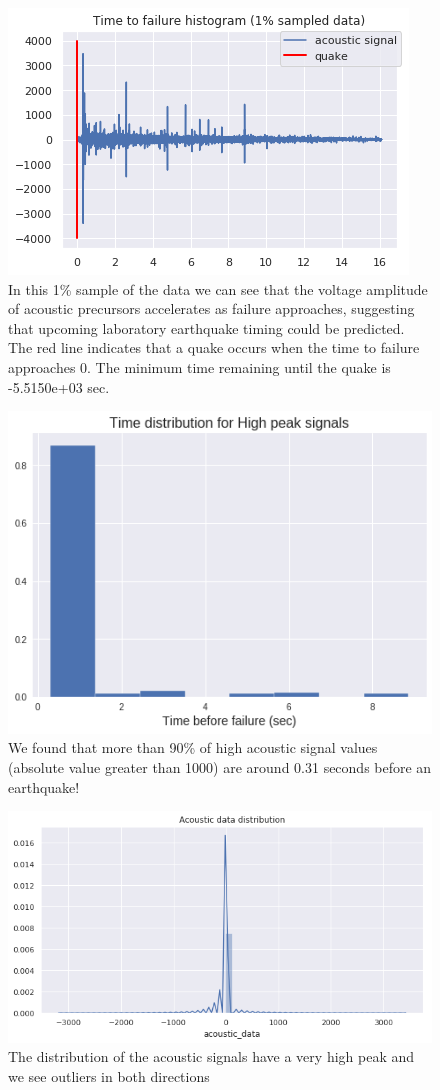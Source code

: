 \documentclass[]{llncs} %
\begin{document}
\begin{figure}
	\centering
	\includegraphics[width=.8\linewidth]{timeToFailureHistogram}
	\caption{In this 1\% sample of the data we can see that the voltage amplitude of acoustic precursors accelerates as failure approaches, suggesting that upcoming laboratory earthquake timing could be predicted. The red line indicates that a quake occurs when the time to failure approaches 0. The minimum time remaining until the quake is -5.5150e+03 sec.}
	\label{fig:timeToFailureHistogram}
\end{figure}
\begin{figure}
	\centering
	\includegraphics[width=.8\linewidth]{timeDistribution}
	\caption{We found that more than 90\% of high acoustic signal values (absolute value greater than 1000) are around 0.31 seconds before an earthquake!}
	\label{fig:timeDistribution}
\end{figure}
\begin{figure}
	\centering
	\includegraphics[width=.9\linewidth]{acousticDataDistribution}
	\caption{The distribution of the acoustic signals have a very high peak and we see outliers in both directions}
	\label{fig:acousticDataDistribution}
\end{figure}
\end{document}
